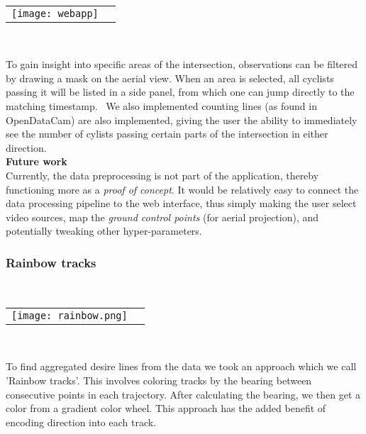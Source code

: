 \ \\ 
\raggedbottom
\begin{tabular}{@{}cc}
\texttt{[image: webapp]} 
\end{tabular}
\label{webapp}
\

To gain insight into specific areas of the intersection, observations can be filtered by drawing a mask on the aerial view. 
When an area is selected, all cyclists passing it will be listed in a side panel, from which one can jump directly to the matching timestamp.
\
We also implemented counting lines (as found in OpenDataCam) are also implemented, giving the user the ability to immediately see the number of 
cylists passing certain parts of the intersection in either direction.
\ \\

\textbf{Future work} \\
Currently, the data preprocessing is not part of the application, thereby functioning more as a \textit{proof of concept}.
It would be relatively easy to connect the data processing pipeline to the web interface, thus simply making the user 
select video sources, map the \textit{ground control points} (for aerial projection), and potentially tweaking other hyper-parameters. 

\subsubsection{Rainbow tracks}

\ \\ 
\noindent
\begin{tabular}{@{}cc}
\texttt{[image: rainbow.png]} 
\end{tabular}
\label{Rainbow}
\

To find aggregated desire lines from the data we took an approach which we call 'Rainbow tracks'. 
This involves coloring tracks by the bearing between consecutive points in each trajectory. 
After calculating the bearing, we then get a color from a gradient color wheel. 
This approach has the added benefit of encoding direction into each track.
\ \\ 


